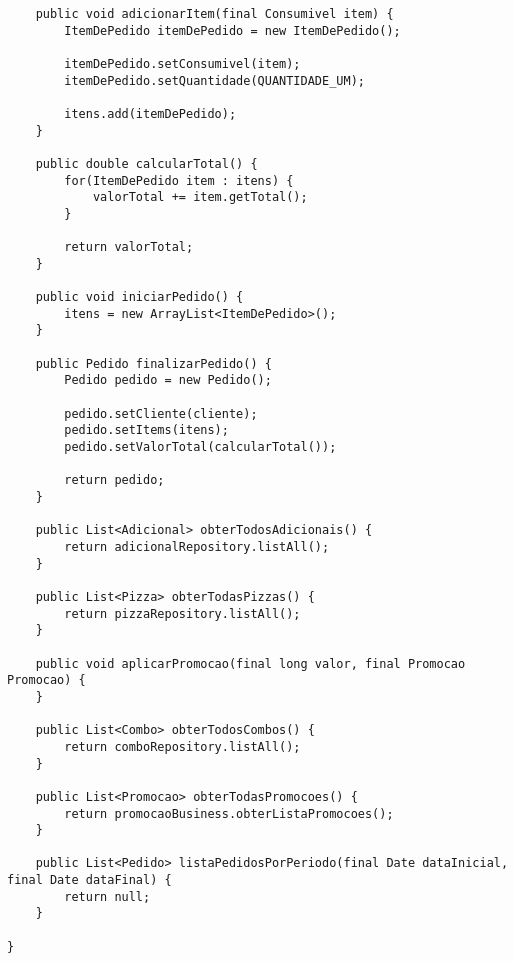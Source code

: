 \begin{lstlisting}
    public void adicionarItem(final Consumivel item) {
        ItemDePedido itemDePedido = new ItemDePedido();
        
        itemDePedido.setConsumivel(item);
        itemDePedido.setQuantidade(QUANTIDADE_UM);
        
        itens.add(itemDePedido);
    }

    public double calcularTotal() {
        for(ItemDePedido item : itens) {
            valorTotal += item.getTotal();
        }
        
        return valorTotal;
    }

    public void iniciarPedido() {
        itens = new ArrayList<ItemDePedido>();
    }

    public Pedido finalizarPedido() {
        Pedido pedido = new Pedido();
        
        pedido.setCliente(cliente);
        pedido.setItems(itens);
        pedido.setValorTotal(calcularTotal());
        
        return pedido;
    }

    public List<Adicional> obterTodosAdicionais() {
        return adicionalRepository.listAll();
    }

    public List<Pizza> obterTodasPizzas() {
        return pizzaRepository.listAll();
    }

    public void aplicarPromocao(final long valor, final Promocao Promocao) {
    }

    public List<Combo> obterTodosCombos() {
        return comboRepository.listAll();
    }

    public List<Promocao> obterTodasPromocoes() {
        return promocaoBusiness.obterListaPromocoes();
    }

    public List<Pedido> listaPedidosPorPeriodo(final Date dataInicial, final Date dataFinal) {
        return null;
    }

}
\end{lstlisting}